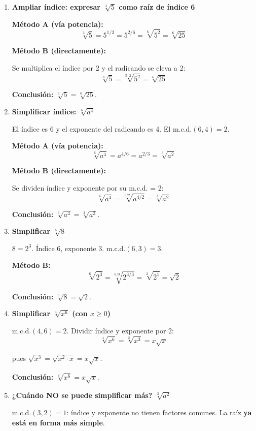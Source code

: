 \documentclass[11pt, letterpaper]{article}
\begin{document}
\begin{tcolorbox}[examplebox, title={Ejemplos — cambio de índice, ambos métodos}]
\begin{enumerate}[label=\textbf{Ej. \arabic*.}, leftmargin=*, itemsep=14pt]

\item \textbf{Ampliar índice: expresar $\sqrt[3]{5}$ como raíz de índice 6}

\textbf{Método A (vía potencia):}
$$\sqrt[3]{5}=5^{1/3}=5^{2/6}=\sqrt[6]{5^2}=\sqrt[6]{25}$$

\textbf{Método B (directamente):}

Se multiplica el índice por 2 y el radicando se eleva a 2:
$$\sqrt[3]{5}=\sqrt[3\cdot 2]{5^2}=\sqrt[6]{25}$$

\textbf{Conclusión:} $\sqrt[3]{5}=\sqrt[6]{25}$.

\item \textbf{Simplificar índice: $\sqrt[6]{a^4}$}

El índice es 6 y el exponente del radicando es 4. El m.c.d.$(6,4)=2$.

\textbf{Método A (vía potencia):}
$$\sqrt[6]{a^4}=a^{4/6}=a^{2/3}=\sqrt[3]{a^2}$$

\textbf{Método B (directamente):}

Se dividen índice y exponente por su m.c.d. = 2:
$$\sqrt[6]{a^4}=\sqrt[6/2]{a^{4/2}}=\sqrt[3]{a^2}$$

\textbf{Conclusión:} $\sqrt[6]{a^4}=\sqrt[3]{a^2}$.

\item \textbf{Simplificar $\sqrt[6]{8}$}

$8=2^3$. Índice 6, exponente 3. m.c.d.$(6,3)=3$.

\textbf{Método B:}
$$\sqrt[6]{2^3}=\sqrt[6/3]{2^{3/3}}=\sqrt[2]{2^1}=\sqrt{2}$$

\textbf{Conclusión:} $\sqrt[6]{8}=\sqrt{2}$.

\item \textbf{Simplificar $\sqrt[4]{x^6}$ (con $x\geq 0$)}

m.c.d.$(4,6)=2$. Dividir índice y exponente por 2:
$$\sqrt[4]{x^6}=\sqrt[2]{x^3}=x\sqrt{x}$$

pues $\sqrt{x^3}=\sqrt{x^2\cdot x}=x\sqrt{x}$.

\textbf{Conclusión:} $\sqrt[4]{x^6}=x\sqrt{x}$.

\item \textbf{¿Cuándo NO se puede simplificar más? $\sqrt[3]{a^2}$}

m.c.d.$(3,2)=1$: índice y exponente no tienen factores comunes. La raíz \textbf{ya está en forma más simple}.

\end{enumerate}
\end{tcolorbox}
\end{document}
